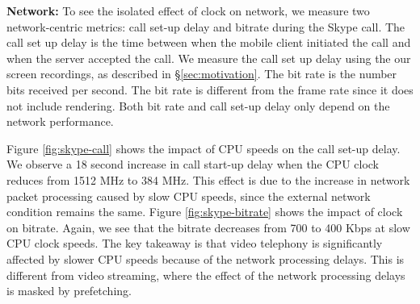 

\noindent \textbf{Network:} 
To see the isolated effect of clock on network, we measure two network-centric metrics: call set-up delay and bitrate during the Skype call. 
The call set up delay is the time between when the mobile client initiated the call and when the server accepted the call. We measure the call set up delay using the our screen recordings, as described in \S\ref{sec:motivation}. The bit rate is the number bits received per second. The bit rate is different from the frame rate since it does not include rendering. Both bit rate and call set-up delay only depend on the network performance.



Figure \ref{fig:skype-call} shows the impact of CPU speeds on the call set-up delay.
We observe a 18 second increase in call start-up delay when the CPU clock reduces from 1512 MHz to 384 MHz. This effect is due to the increase in network packet processing caused by slow CPU speeds, since the external network condition remains the same. Figure \ref{fig:skype-bitrate} shows the impact of clock on bitrate. 
Again, we see that the bitrate decreases from 700 to 400 Kbps at slow CPU clock speeds. The key takeaway is that video telephony is significantly affected by slower CPU speeds because of the network processing delays. This is different from video streaming, where the effect of the network processing delays is masked by prefetching.


